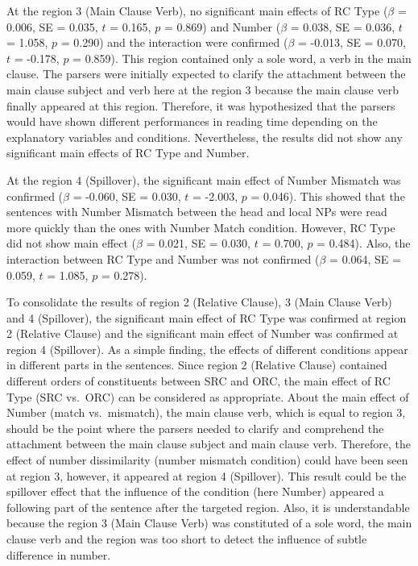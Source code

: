 \documentclass[
]{article}
\begin{document}
At the region 3 (Main Clause Verb), no significant main effects of RC
Type (\(\beta\) = 0.006, SE = 0.035, \(t\) = 0.165, \(p\) = 0.869) and
Number (\(\beta\) = 0.038, SE = 0.036, \(t\) = 1.058, \(p\) = 0.290) and
the interaction were confirmed (\(\beta\) = -0.013, SE = 0.070, \(t\) =
-0.178, \(p\) = 0.859). This region contained only a sole word, a verb
in the main clause. The parsers were initially expected to clarify the
attachment between the main clause subject and verb here at the region 3
because the main clause verb finally appeared at this region. Therefore,
it was hypothesized that the parsers would have shown different
performances in reading time depending on the explanatory variables and
conditions. Nevertheless, the results did not show any significant main
effects of RC Type and Number.

At the region 4 (Spillover), the significant main effect of Number
Mismatch was confirmed (\(\beta\) = -0.060, SE = 0.030, \(t\) = -2.003,
\(p\) = 0.046). This showed that the sentences with Number Mismatch
between the head and local NPs were read more quickly than the ones with
Number Match condition. However, RC Type did not show main effect
(\(\beta\) = 0.021, SE = 0.030, \(t\) = 0.700, \(p\) = 0.484). Also, the
interaction between RC Type and Number was not confirmed (\(\beta\) =
0.064, SE = 0.059, \(t\) = 1.085, \(p\) = 0.278).

To consolidate the results of region 2 (Relative Clause), 3 (Main Clause
Verb) and 4 (Spillover), the significant main effect of RC Type was
confirmed at region 2 (Relative Clause) and the significant main effect
of Number was confirmed at region 4 (Spillover). As a simple finding,
the effects of different conditions appear in different parts in the
sentences. Since region 2 (Relative Clause) contained different orders
of constituents between SRC and ORC, the main effect of RC Type (SRC
vs.~ORC) can be considered as appropriate. About the main effect of
Number (match vs.~mismatch), the main clause verb, which is equal to
region 3, should be the point where the parsers needed to clarify and
comprehend the attachment between the main clause subject and main
clause verb. Therefore, the effect of number dissimilarity (number
mismatch condition) could have been seen at region 3, however, it
appeared at region 4 (Spillover). This result could be the spillover
effect that the influence of the condition (here Number) appeared a
following part of the sentence after the targeted region. Also, it is
understandable because the region 3 (Main Clause Verb) was constituted
of a sole word, the main clause verb and the region was too short to
detect the influence of subtle difference in number.
\end{document}
